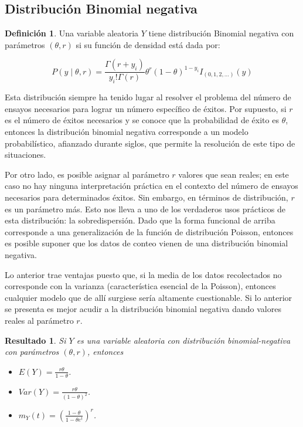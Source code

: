 \documentclass[
  12pt,
  spanish,
]{book}
\providecommand{\tightlist}{%
  \setlength{\itemsep}{0pt}\setlength{\parskip}{0pt}}
\newtheorem{proposition}{Resultado}[chapter]
\theoremstyle{definition}
\newtheorem{definition}{Definición}[chapter]
\theoremstyle{definition}
\theoremstyle{definition}
\theoremstyle{definition}
\theoremstyle{remark}
\begin{document}
\hypertarget{distribuciuxf3n-binomial-negativa}{%
\subsection{Distribución Binomial negativa}\label{distribuciuxf3n-binomial-negativa}}

\begin{definition}
\protect\hypertarget{def:unnamed-chunk-11}{}{\label{def:unnamed-chunk-11} }Una variable aleatoria \(Y\) tiene distribución Binomial negativa con parámetros \((\theta, r)\) si su función de densidad está dada por:

\begin{equation}
P(y\mid \theta, r)=\frac{\Gamma(r+y_i)}{y_i!\Gamma(r)}\theta^r(1-\theta)^{1-y_i}I_{(0,1,2,\ldots)}(y)
\end{equation}
\end{definition}

Esta distribución siempre ha tenido lugar al resolver el problema del número de ensayos necesarios para lograr un número específico de éxitos. Por supuesto, si \(r\) es el número de éxitos necesarios y se conoce que la probabilidad de éxito es \(\theta\), entonces la distribución binomial negativa corresponde a un modelo probabilístico, afianzado durante siglos, que permite la resolución de este tipo de situaciones.

Por otro lado, es posible asignar al parámetro \(r\) valores que sean reales; en este caso no hay ninguna interpretación práctica en el contexto del número de ensayos necesarios para determinados éxitos. Sin embargo, en términos de distribución, \(r\) es un parámetro más. Esto nos lleva a uno de los verdaderos usos prácticos de esta distribución: la sobredispersión. Dado que la forma funcional de arriba corresponde a una generalización de la función de distribución Poisson, entonces es posible suponer que los datos de conteo vienen de una distribución binomial negativa.

Lo anterior trae ventajas puesto que, si la media de los datos recolectados no corresponde con la varianza (característica esencial de la Poisson), entonces cualquier modelo que de allí surgiese sería altamente cuestionable. Si lo anterior se presenta es mejor acudir a la distribución binomial negativa dando valores reales al parámetro \(r\).

\begin{proposition}
\protect\hypertarget{prp:unnamed-chunk-12}{}{\label{prp:unnamed-chunk-12} }Si \(Y\) es una variable aleatoria con distribución binomial-negativa con parámetros \((\theta, r)\), entonces

\begin{itemize}
\tightlist
\item
  \(E(Y)=\frac{r\theta}{1-\theta}\).
\item
  \(Var(Y)=\frac{r\theta}{(1-\theta)^2}\).
\item
  \(m_Y(t)=\left(\frac{1-\theta}{1-\theta e^t}\right)^r\).
\end{itemize}
\end{proposition}
\end{document}
